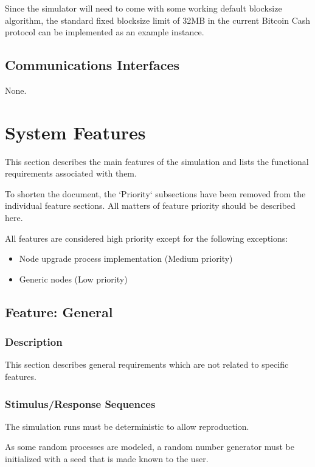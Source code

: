 \documentclass{scrreprt}
\begin{document}
Since the simulator will need to come with some working default blocksize
algorithm, the standard fixed blocksize limit of 32MB in the current
Bitcoin Cash protocol can be implemented as an example instance.


\section{Communications Interfaces}
None.


\chapter{System Features}

This section describes the main features of the simulation and lists the
functional requirements associated with them.

To shorten the document, the `Priority` subsections have been removed
from the individual feature sections. All matters of feature priority should
be described here.

All features are considered high priority except for the following exceptions:

\begin{itemize}
   \item Node upgrade process implementation (Medium priority)
   \item Generic nodes (Low priority)
\end{itemize}


\section{Feature: General}

\subsection{Description}

This section describes general requirements which are not related to
specific features.


\subsection{Stimulus/Response Sequences}

The simulation runs must be deterministic to allow reproduction.

As some random processes are modeled, a random number generator must be
initialized with a seed that is made known to the user.
\end{document}
